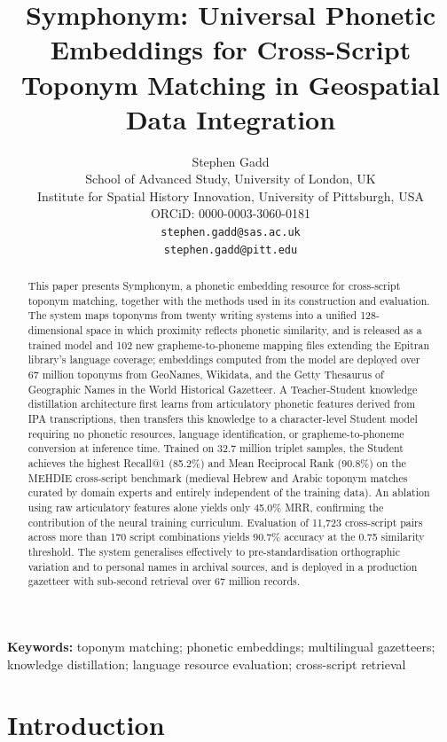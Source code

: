 \documentclass[11pt,a4paper]{article}
\title{Symphonym: Universal Phonetic Embeddings for Cross-Script Toponym Matching in Geospatial Data Integration}
\author{Stephen Gadd\\
\small School of Advanced Study, University of London, UK\\
\small Institute for Spatial History Innovation, University of Pittsburgh, USA\\
\small ORCiD: 0000-0003-3060-0181\\
\small \texttt{stephen.gadd@sas.ac.uk}\\
\small \texttt{stephen.gadd@pitt.edu}}
\date{}
\begin{document}
\maketitle

\begin{abstract}
This paper presents Symphonym, a phonetic embedding resource for cross-script toponym matching, together with the methods used in its construction and evaluation. The system maps toponyms from twenty writing systems into a unified 128-dimensional space in which proximity reflects phonetic similarity, and is released as a trained model and 102 new grapheme-to-phoneme mapping files extending the Epitran library's language coverage; embeddings computed from the model are deployed over 67 million toponyms from GeoNames, Wikidata, and the Getty Thesaurus of Geographic Names in the World Historical Gazetteer. A Teacher-Student knowledge distillation architecture first learns from articulatory phonetic features derived from IPA transcriptions, then transfers this knowledge to a character-level Student model requiring no phonetic resources, language identification, or grapheme-to-phoneme conversion at inference time. Trained on 32.7 million triplet samples, the Student achieves the highest Recall@1 (85.2\%) and Mean Reciprocal Rank (90.8\%) on the MEHDIE cross-script benchmark (medieval Hebrew and Arabic toponym matches curated by domain experts and entirely independent of the training data). An ablation using raw articulatory features alone yields only 45.0\% MRR, confirming the contribution of the neural training curriculum. Evaluation of 11,723 cross-script pairs across more than 170 script combinations yields 90.7\% accuracy at the 0.75 similarity threshold. The system generalises effectively to pre-standardisation orthographic variation and to personal names in archival sources, and is deployed in a production gazetteer with sub-second retrieval over 67 million records.
\end{abstract}

\textbf{Keywords:} toponym matching; phonetic embeddings; multilingual gazetteers; knowledge distillation; language resource evaluation; cross-script retrieval


\section{Introduction}
\label{sec:introduction}
\end{document}
